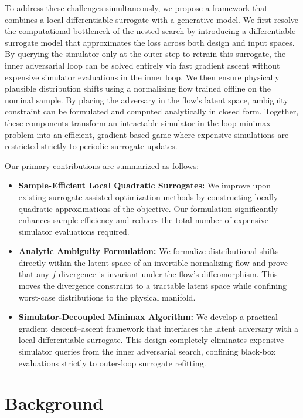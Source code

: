 \documentclass[11pt]{article}
\begin{document}
To address these challenges simultaneously, we propose a framework that combines a local differentiable surrogate with a generative model. We first resolve the computational bottleneck of the nested search by introducing a differentiable surrogate model that approximates the loss across both design and input spaces. By querying the simulator only at the outer step to retrain this surrogate, the inner adversarial loop can be solved entirely via fast gradient ascent without expensive simulator evaluations in the inner loop. We then ensure physically plausible distribution shifts using a normalizing flow trained offline on the nominal sample. By placing the adversary in the flow's latent space, ambiguity constraint can be formulated and computed analytically in closed form. Together, these components transform an intractable simulator-in-the-loop minimax problem into an efficient, gradient-based game where expensive simulations are restricted strictly to periodic surrogate updates.


Our primary contributions are summarized as follows:

\begin{itemize}
    \item \textbf{Sample-Efficient Local Quadratic Surrogates:} We improve upon existing surrogate-assisted optimization methods by constructing locally quadratic approximations of the objective. Our formulation significantly enhances sample efficiency and reduces the total number of expensive simulator evaluations required.

  \item \textbf{Analytic Ambiguity Formulation:} We formalize distributional shifts directly within the latent space of an invertible normalizing flow and prove that any $f$-divergence is invariant under the flow's diffeomorphism. This moves the divergence constraint to a tractable latent space while confining worst-case distributions to the physical manifold. 

  \item \textbf{Simulator-Decoupled Minimax Algorithm:} We develop a practical gradient descent--ascent framework that interfaces the latent adversary with a local differentiable surrogate. This design completely eliminates expensive simulator queries from the inner adversarial search, confining black-box evaluations strictly to outer-loop surrogate refitting.
\end{itemize}


\section{Background}
\label{sec:background}
\end{document}
